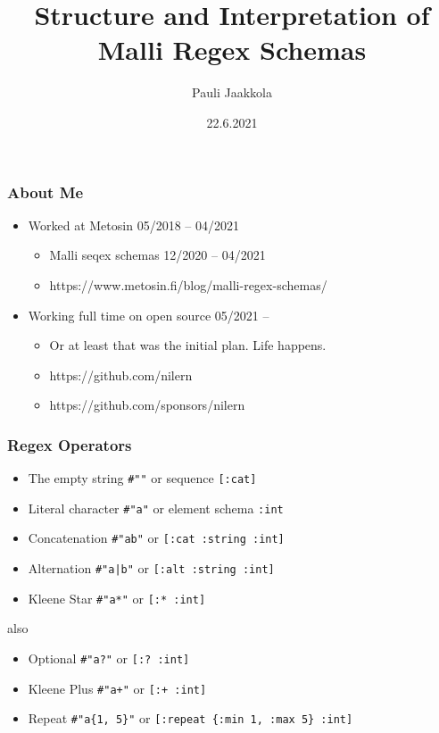 \documentclass{beamer}
\title{Structure and Interpretation of Malli Regex Schemas}
\author{Pauli Jaakkola}
\date{22.6.2021}
\begin{document}
\frame{\titlepage}


\begin{frame}
\frametitle{About Me}

\begin{itemize}
\item Worked at Metosin 05/2018 -- 04/2021
\begin{itemize}
    \item Malli seqex schemas 12/2020 -- 04/2021
    \item https://www.metosin.fi/blog/malli-regex-schemas/
\end{itemize}
\item Working full time on open source 05/2021 --
\begin{itemize}
    \item Or at least that was the initial plan. Life happens.
    \item https://github.com/nilern
    \item https://github.com/sponsors/nilern
\end{itemize}
\end{itemize}
\end{frame}


\begin{frame}
\frametitle{Regex Operators}

\begin{itemize}
\item The empty string \texttt{\#""} or sequence \texttt{[:cat]}
\item Literal character \texttt{\#"a"} or element schema \texttt{:int}
\item Concatenation \texttt{\#"ab"} or \texttt{[:cat :string :int]}
\item Alternation \texttt{\#"a|b"} or \texttt{[:alt :string :int]}
\item Kleene Star \texttt{\#"a*"} or \texttt{[:* :int]}
\end{itemize}

also

\begin{itemize}
\item Optional \texttt{\#"a?"} or \texttt{[:? :int]}
\item Kleene Plus \texttt{\#"a+"} or \texttt{[:+ :int]}
\item Repeat \texttt{\#"a\{1, 5\}"} or \texttt{[:repeat \{:min 1, :max 5\} :int]}
\end{itemize}

\end{frame}
\end{document}
